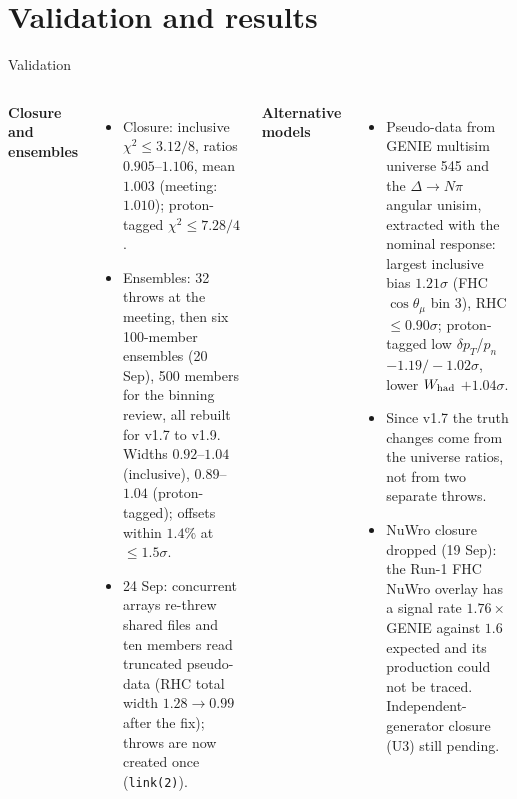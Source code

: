 \documentclass[aspectratio=169,10pt]{beamer}
\begin{document}
\section{Validation and results}

\begin{frame}{Validation}
  \begin{columns}[T]
  \textbf{\color{ubred}Closure and ensembles}
  \begin{itemize}\footnotesize\setlength\itemsep{2pt}
    \item Closure: inclusive $\chi^2\leq3.12/8$, ratios $0.905$--$1.106$, mean $1.003$ (meeting: $1.010$);
          proton-tagged $\chi^2\leq7.28/4$.
    \item Ensembles: 32 throws at the meeting, then six 100-member ensembles (20 Sep), 500 members for the binning
          review, all rebuilt for v1.7 to v1.9. Widths $0.92$--$1.04$ (inclusive), $0.89$--$1.04$ (proton-tagged);
          offsets within $1.4\%$ at $\leq1.5\sigma$.
    \item 24 Sep: concurrent arrays re-threw shared files and ten members read truncated pseudo-data (RHC total width
          $1.28\to0.99$ after the fix); throws are now created once (\texttt{link(2)}).
  \end{itemize}
  \textbf{\color{ubred}Alternative models}
  \begin{itemize}\footnotesize\setlength\itemsep{2pt}
    \item Pseudo-data from GENIE multisim universe 545 and the $\Delta\to N\pi$ angular unisim, extracted with the
          nominal response: largest inclusive bias $1.21\sigma$ (FHC $\cos\theta_\mu$ bin 3), RHC $\leq0.90\sigma$;
          proton-tagged low $\delta p_T$/$p_n$ $-1.19/-1.02\sigma$, lower $W_{\rm had}$ $+1.04\sigma$.
    \item Since v1.7 the truth changes come from the universe ratios, not from two separate throws.
    \item NuWro closure dropped (19 Sep): the Run-1 FHC NuWro overlay has a signal rate $1.76\times$ GENIE against
          $1.6$ expected and its production could not be traced. Independent-generator closure (U3) still pending.
  \end{itemize}
  \end{columns}
\end{frame}
\end{document}
